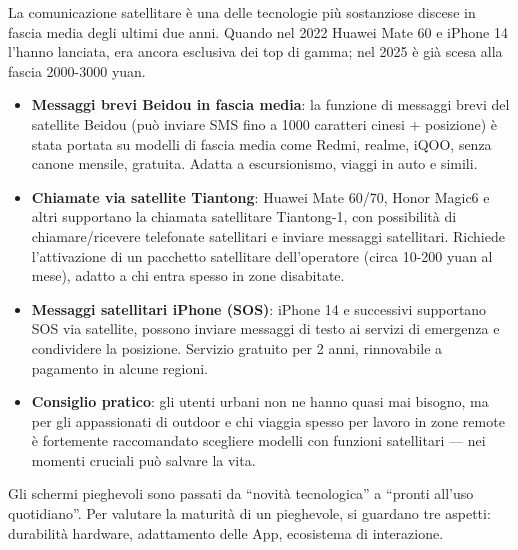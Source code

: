 
La comunicazione satellitare è una delle tecnologie più sostanziose discese in fascia media degli ultimi due anni. Quando nel 2022 Huawei Mate 60 e iPhone 14 l'hanno lanciata, era ancora esclusiva dei top di gamma; nel 2025 è già scesa alla fascia 2000-3000 yuan.

\begin{itemize}
  \item \textbf{Messaggi brevi Beidou in fascia media}: la funzione di messaggi brevi del satellite Beidou (può inviare SMS fino a 1000 caratteri cinesi + posizione) è stata portata su modelli di fascia media come Redmi, realme, iQOO, senza canone mensile, gratuita. Adatta a escursionismo, viaggi in auto e simili.
  \item \textbf{Chiamate via satellite Tiantong}: Huawei Mate 60/70, Honor Magic6 e altri supportano la chiamata satellitare Tiantong-1, con possibilità di chiamare/ricevere telefonate satellitari e inviare messaggi satellitari. Richiede l'attivazione di un pacchetto satellitare dell'operatore (circa 10-200 yuan al mese), adatto a chi entra spesso in zone disabitate.
  \item \textbf{Messaggi satellitari iPhone (SOS)}: iPhone 14 e successivi supportano SOS via satellite, possono inviare messaggi di testo ai servizi di emergenza e condividere la posizione. Servizio gratuito per 2 anni, rinnovabile a pagamento in alcune regioni.
  \item \textbf{Consiglio pratico}: gli utenti urbani non ne hanno quasi mai bisogno, ma per gli appassionati di outdoor e chi viaggia spesso per lavoro in zone remote è fortemente raccomandato scegliere modelli con funzioni satellitari — nei momenti cruciali può salvare la vita.
\end{itemize}


Gli schermi pieghevoli sono passati da “novità tecnologica” a “pronti all'uso quotidiano”. Per valutare la maturità di un pieghevole, si guardano tre aspetti: durabilità hardware, adattamento delle App, ecosistema di interazione.

